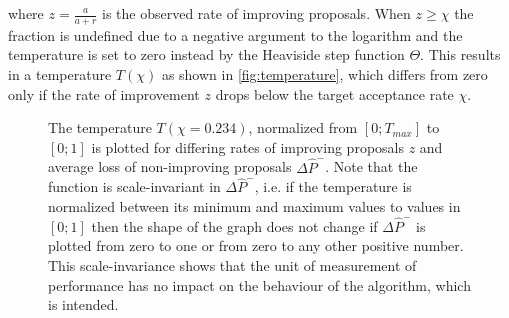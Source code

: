 \documentclass[oneside, a4paper]{book}
\newcommand\br[1]{\left(#1\right)}
\begin{document}
    where $z=\frac{a}{a+r}$ is the observed rate of improving proposals. When $z\geq\chi$ the fraction is undefined due to a negative argument to the logarithm and the temperature is set to zero instead by the Heaviside step function $\Theta$. This results in a temperature $T\br{\chi}$ as shown in \autoref{fig:temperature}, which differs from zero only if the rate of improvement $z$ drops below the target acceptance rate $\chi$.


    \begin{figure}
      \centering
      \caption{The temperature $T\br{\chi=0.234}$, normalized from $[0;T_{max}]$ to $[0;1]$ is plotted for differing rates of improving proposals $z$ and average loss of non-improving proposals $\Delta \hat{P}^-$. Note that the function is scale-invariant in $\Delta\hat{P}^-$, i.e. if the temperature is normalized between its minimum and maximum values to values in $[0;1]$ then the shape of the graph does not change if $\Delta\hat{P}^-$ is plotted from zero to one or from zero to any other positive number. This scale-invariance shows that the unit of measurement of performance has no impact on the behaviour of the algorithm, which is intended. 
}
\end{figure}
\end{document}
